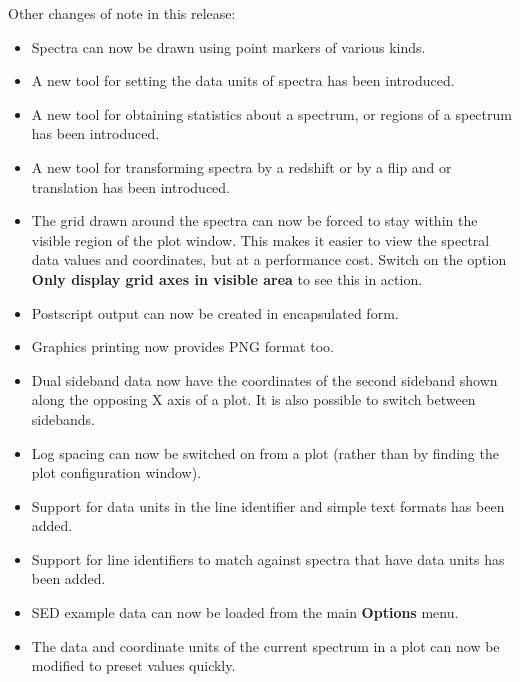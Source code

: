 \documentclass[twoside,11pt]{article}
\renewcommand{\_}{\texttt{\symbol{95}}}
\newcommand{\labelitem}[1]{\textbf{#1}}
\begin{document}
Other changes of note in this release:
\begin{itemize}
\item Spectra can now be drawn using point markers of various kinds.

\item A new tool for setting the data units of spectra has been introduced.

\item A new tool for obtaining statistics about a spectrum, or regions of a
      spectrum has been introduced.

\item A new tool for transforming spectra by a redshift or by a flip and or
      translation has been introduced.

\item The grid drawn around the spectra can now be forced to stay within
      the visible region of the plot window. This makes it easier to view
      the spectral data values and coordinates, but at a performance cost.
      Switch on the option \labelitem{Only display grid axes in visible area}
      to see this in action.

\item Postscript output can now be created in encapsulated form.

\item Graphics printing now provides PNG format too.

\item Dual sideband data now have the coordinates of the second sideband
      shown along the opposing X axis of a plot. It is also possible to
      switch between sidebands.

\item Log spacing can now be switched on from a plot (rather than by finding
      the plot configuration window).

\item Support for data units in the line identifier and simple text formats
      has been added.

\item Support for line identifiers to match against spectra that have data
      units has been added.

\item SED example data can now be loaded from the main \labelitem{Options}
      menu.

\item The data and coordinate units of the current spectrum in a plot
      can now be modified to preset values quickly.


\end{itemize}
\end{document}

